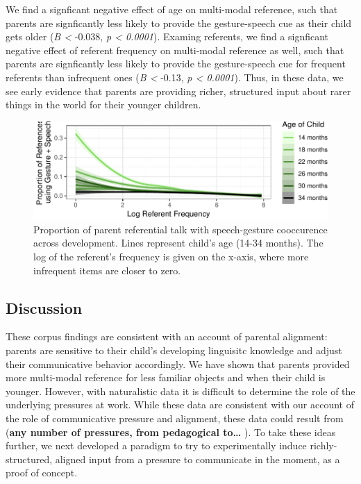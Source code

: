 \documentclass[10pt, letterpaper]{article}
\newenvironment{CodeChunk}{}{}
\begin{document}
We find a signficant negative effect of age on multi-modal reference,
such that parents are signficantly less likely to provide the
gesture-speech cue as their child gets older (\emph{B \textless{}}
-0.038, \emph{p \textless{} 0.0001}). Examing referents, we find a
signficant negative effect of referent frequency on multi-modal
reference as well, such that parents are signficantly less likely to
provide the gesture-speech cue for frequent referents than infrequent
ones (\emph{B \textless{}} -0.13, \emph{p \textless{} 0.0001}). Thus, in
these data, we see early evidence that parents are providing richer,
structured input about rarer things in the world for their younger
children.

\begin{CodeChunk}
\begin{figure}[tb]

{\centering \includegraphics{figs/corpus_plot-1} 

}

\caption[Proportion of parent referential talk with speech-gesture cooccurence across development]{Proportion of parent referential talk with speech-gesture cooccurence across development. Lines represent child's age (14-34 months). The log of the referent's frequency is given on the x-axis, where more infrequent items are closer to zero.}\label{fig:corpus_plot}
\end{figure}
\end{CodeChunk}

\hypertarget{discussion}{%
\subsection{Discussion}\label{discussion}}

These corpus findings are consistent with an account of parental
alignment: parents are sensitive to their child's developing linguisitc
knowledge and adjust their communicative behavior accordingly. We have
shown that parents provided more multi-modal reference for less familiar
objects and when their child is younger. However, with naturalistic data
it is difficult to determine the role of the underlying pressures at
work. While these data are consistent with our account of the role of
communicative pressure and alignment, these data could result from
(\textbf{any number of pressures, from pedagogical to\ldots{} }). To
take these ideas further, we next developed a paradigm to try to
experimentally induce richly-structured, aligned input from a pressure
to communicate in the moment, as a proof of concept.
\end{document}
